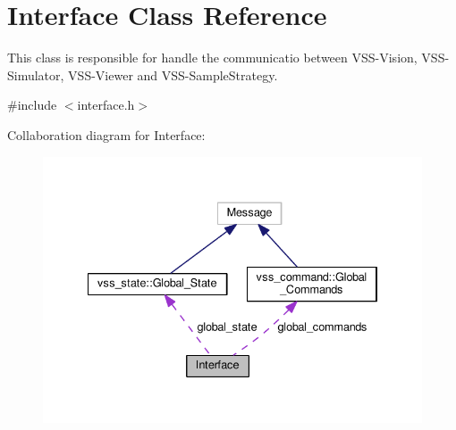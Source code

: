 \hypertarget{classInterface}{}\section{Interface Class Reference}
\label{classInterface}


This class is responsible for handle the communicatio between V\+S\+S-\/\+Vision, V\+S\+S-\/\+Simulator, V\+S\+S-\/\+Viewer and V\+S\+S-\/\+Sample\+Strategy.  




{\ttfamily \#include $<$interface.\+h$>$}



Collaboration diagram for Interface\+:
\nopagebreak
\begin{figure}[H]
\begin{center}
\leavevmode
\includegraphics[width=334pt]{classInterface__coll__graph}
\end{center}
\end{figure}
